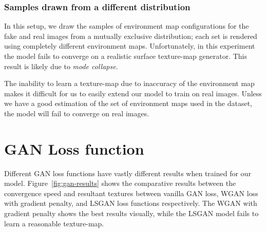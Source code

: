 \subsubsection{Samples drawn from a different distribution}

In this setup, we draw the samples of environment map configurations for the fake and real
images from a mutually exclusive distribution; each set is rendered using completely different
environment maps. Unfortunately, in this experiment the model fails to converge on a realistic
surface texture-map generator. This result is likely due to \emph{mode collapse}.

The inability to learn a texture-map due to inaccuracy of the environment map makes it difficult
for us to easily extend our model to train on real images. Unless we have a good estimation
of the set of environment maps used in the dataset, the model will fail to converge on real images.

\section{GAN Loss function}

Different GAN loss functions have vastly different results when trained for our model.
Figure~\ref{fig:gan-results} shows the comparative results between the convergence speed and
resultant textures between vanilla GAN loss, WGAN loss with gradient penalty, and LSGAN loss
functions respectively. The WGAN with gradient penalty shows the best results visually, while the
LSGAN model fails to learn a reasonable texture-map.

